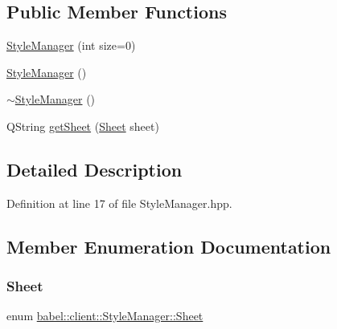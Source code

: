 \subsection*{Public Member Functions}
\begin{DoxyCompactItemize}
\item 
\mbox{\hyperlink{classbabel_1_1client_1_1_style_manager_afefc9fac75c3fd5ef262457a38b0c0fc}{Style\+Manager}} (int size=0)
\item 
\mbox{\hyperlink{classbabel_1_1client_1_1_style_manager_a2336da1d7c88fd09319a8c33f6b8e7a5}{Style\+Manager}} ()
\item 
\mbox{\hyperlink{classbabel_1_1client_1_1_style_manager_af89de5ce5a3b422f85dec7605696211f}{$\sim$\+Style\+Manager}} ()
\item 
Q\+String \mbox{\hyperlink{classbabel_1_1client_1_1_style_manager_ad4989b460da50299c8aecb2d4249a912}{get\+Sheet}} (\mbox{\hyperlink{classbabel_1_1client_1_1_style_manager_a187dbf4a4f46c89dd5119496eb2fda52}{Sheet}} sheet)
\end{DoxyCompactItemize}


\subsection{Detailed Description}


Definition at line 17 of file Style\+Manager.\+hpp.



\subsection{Member Enumeration Documentation}
\mbox{\label{classbabel_1_1client_1_1_style_manager_a187dbf4a4f46c89dd5119496eb2fda52}} 
\subsubsection{\texorpdfstring{Sheet}{Sheet}}
{\footnotesize\ttfamily enum \mbox{\hyperlink{classbabel_1_1client_1_1_style_manager_a187dbf4a4f46c89dd5119496eb2fda52}{babel\+::client\+::\+Style\+Manager\+::\+Sheet}}}

